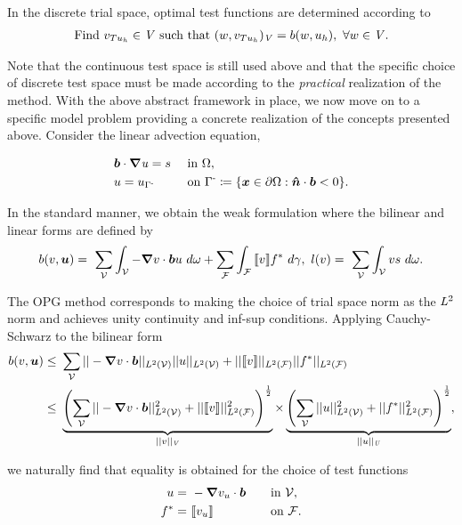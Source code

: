 \documentclass[]{article}
\begin{document}
In the discrete trial space, optimal test functions are determined according to
\begin{align} \label{eq:auxiliary_opt_v}
\text{Find}\ v_{T u_h} \in \mathit{{{V}}}\ \text{such that}\
(w,v_{T u_h})_{\mathit{{{V}}}} = b(w,u_h),\ \forall w \in \mathit{{{V}}}.
\end{align}

Note that the continuous test space is still used above and that the specific
choice of discrete test space must be made according to the \emph{practical}
realization of the method.
\fi
With the above abstract framework in place, we now move
on to a specific model problem providing a concrete realization of the concepts
presented above. Consider the linear advection equation,

\begin{alignat}{3}
& \varv{b} \cdot \nabla \vars{u} = s\ && \text{in}\ \Omega, \label{eq:linear_advection_omega} \\
& u = u_{\Gamma^{\text{-}}}\ && \text{on}\ \Gamma^{\text{-}} \coloneqq \{ \varv{x} \in \partial\Omega : \varv{\hat{n}} \cdot \vect{b} < 0 \}.
\end{alignat}

In the standard manner, we obtain the weak formulation where the bilinear and
linear forms are defined by
\begin{align} \label{eq:bilinear_pg_advection_jump}
b(v,\varg{u})
=\ \sum_{\fe{V}} \int_{\fe{V}} - \nabla v \cdot \varv{b} u\ d\omega
+ \sum_{\fe{F}} \int_{\fe{F}} \jump{v} f^*\ d\gamma,\
l(v)
=\ \sum_{\fe{V}} \int_{\fe{V}} v s\ d\omega.
\end{align}

The OPG method corresponds to making the choice of trial space norm as the
$\mathit{{{L}}}^2$ norm and achieves unity continuity and inf-sup conditions.
Applying Cauchy-Schwarz to the bilinear form
\begin{align} \label{eq:cauchy_scwarz_advection}
b(v,\varg{u})
\le\ & \sum_{\fe{V}}
|| - \nabla v \cdot \varv{b} ||_{L^2(\fe{V})} || u ||_{L^2(\fe{V})}
+
||\jump{v}||_{L^2(\fe{F})} ||f^*||_{L^2(\fe{F})} \\
\le\ &
\underbrace{\left(
\sum_{\fe{V}} || - \nabla v \cdot \varv{b} ||^2_{L^2(\fe{V})} + ||\jump{v}||^2_{L^2(\fe{F})}
\right)^\frac{1}{2}}_{||v||_\fspace{V}}
       \times
\underbrace{\left(
\sum_{\fe{V}} || u ||^2_{L^2(\fe{V})} + ||f^*||^2_{L^2(\fe{F})}
\right)^\frac{1}{2}}_{||u||_\fspace{U}},
\end{align}

we naturally find that equality is obtained for the choice of test functions
\begin{alignat}{3}
u =\ & -\nabla v_u \cdot \vect{b}\quad && \text{in}\ \fe{V}, \\
f^* =\ & \jump{v_u} && \text{on}\ \fe{F}.
\end{alignat}
\end{document}
